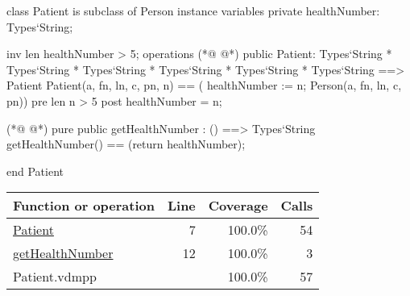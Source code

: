 \begin{vdmpp}[breaklines=true]
class Patient is subclass of Person
instance variables
  private healthNumber: Types`String;
  
  inv len healthNumber > 5;
operations
(*@
\label{Patient:7}
@*)
 public Patient: Types`String * Types`String * Types`String * Types`String * Types`String * Types`String ==> Patient
  Patient(a, fn, ln, c, pn, n) == ( healthNumber := n; Person(a, fn, ln, c, pn))
 pre len n > 5
 post healthNumber = n;
 
(*@
\label{getHealthNumber:12}
@*)
 pure public getHealthNumber : () ==> Types`String
  getHealthNumber() == (return healthNumber);

end Patient
\end{vdmpp}
\bigskip
\begin{longtable}{|l|r|r|r|}
\hline
Function or operation & Line & Coverage & Calls \\
\hline
\hline
\hyperref[Patient:7]{Patient} & 7&100.0\% & 54 \\
\hline
\hyperref[getHealthNumber:12]{getHealthNumber} & 12&100.0\% & 3 \\
\hline
\hline
Patient.vdmpp & & 100.0\% & 57 \\
\hline
\end{longtable}

